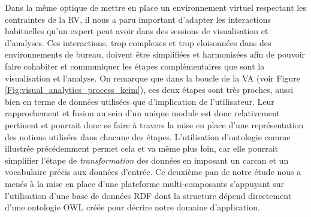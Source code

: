 Dans la même optique de mettre en place un environnement virtuel respectant les contraintes de la RV, il nous a paru important d'adapter les interactions habituelles qu'un expert peut avoir dans des sessions de visualisation et d'analyses. Ces interactions, trop complexes et trop cloisonnées dans des environnements de bureau, doivent être simplifiées et harmonisées afin de pouvoir faire cohabiter et communiquer les étapes complémentaires que sont la visualisation et l'analyse. On remarque que dans la boucle de la VA (voir Figure \ref{Fig:visual_analytics_process_keim}), ces deux étapes sont très proches, aussi bien en terme de données utilisées que d'implication de l'utilisateur. Leur rapprochement et fusion au sein d'un unique module est donc relativement pertinent et pourrait donc se faire à travers la mise en place d'une représentation des notions utilisées dans chacune des étapes. L'utilisation d'ontologie comme illustrée précédemment permet cela et va même plus loin, car elle pourrait simplifier l'étape de \textit{transformation} des données en imposant un carcan et un vocabulaire précis aux données d'entrée. Ce deuxième pan de notre étude nous a menés à la mise en place d'une plateforme multi-composants s'appuyant sur l'utilisation d'une base de données RDF dont la structure dépend directement d'une ontologie OWL créée pour décrire notre domaine d'application.


